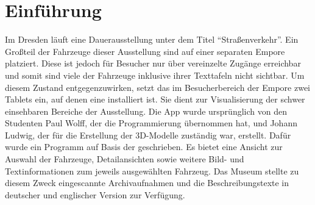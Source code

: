 \chapter{Einführung}
\label{chap:intro}
Im \vmd{} Dresden läuft eine Dauerausstellung unter dem Titel \enquote{Straßenverkehr}. Ein Großteil der Fahrzeuge dieser Ausstellung sind auf einer separaten Empore platziert. Diese ist jedoch für Besucher nur über vereinzelte Zugänge erreichbar und somit sind viele der Fahrzeuge inklusive ihrer Texttafeln nicht sichtbar. Um diesem Zustand entgegenzuwirken, setzt das \vmd{} im Besucherbereich der Empore zwei Tablets ein, auf denen eine \mapp{} installiert ist. Sie dient zur Visualisierung der schwer einsehbaren Bereiche der Ausstellung. Die App wurde ursprünglich von den Studenten Paul Wolff, der die Programmierung übernommen hat, und Johann Ludwig, der für die Erstellung der 3D-Modelle zuständig war, erstellt. Dafür wurde ein Programm auf Basis der \unite{} geschrieben. Es bietet eine Ansicht zur Auswahl der Fahrzeuge, Detailansichten sowie weitere Bild- und Textinformationen zum jeweils ausgewählten Fahrzeug. Das Museum stellte zu diesem Zweck eingescannte Archivaufnahmen und die Beschreibungstexte in deutscher und englischer Version zur Verfügung.
%